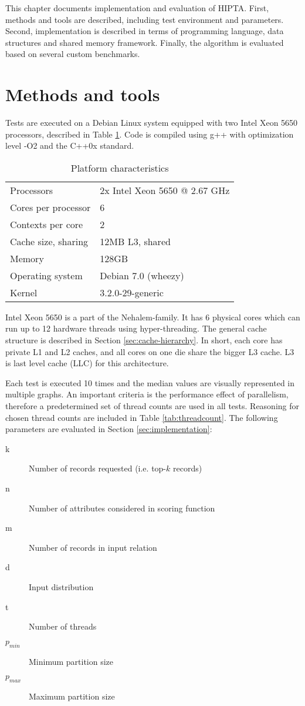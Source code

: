 This chapter documents implementation and evaluation of HIPTA. First,
methods and tools are described, including test environment and
parameters. Second, implementation is described in terms of
programming language, data structures and shared memory framework.
Finally, the algorithm is evaluated based on several custom
benchmarks.

\section{Methods and tools}
\label{sec:methods-and-tools}

Tests are executed on a Debian Linux system equipped with two Intel
Xeon 5650 processors, described in Table \ref{tab:environment}. Code
is compiled using g++ with optimization level -O2 and the C++0x
standard.

\begin{table}[H]
	\centering
	\begin{tabular}{|l|l|}
	\hline
	Processors & 2x Intel Xeon 5650 @ 2.67 GHz \\
	Cores per processor & 6 \\
	Contexts per core & 2 \\
	Cache size, sharing & 12MB L3, shared \\
	Memory & 128GB \\
	Operating system & Debian 7.0 (wheezy) \\
	Kernel & 3.2.0-29-generic \\
	\hline
	\end{tabular}
	\caption{Platform characteristics}
	\label{tab:environment}
\end{table}

Intel Xeon 5650 is a part of the Nehalem-family. It has 6 physical
cores which can run up to 12 hardware threads using hyper-threading.
The general cache structure is described in Section
\ref{sec:cache-hierarchy}. In short, each core has private L1 and L2
caches, and all cores on one die share the bigger L3 cache. L3 is last
level cache (LLC) for this architecture.

Each test is executed 10 times and the median values are visually
represented in multiple graphs. An important criteria is the
performance effect of parallelism, therefore a predetermined set of
thread counts are used in all tests. Reasoning for chosen thread
counts are included in Table \ref{tab:threadcount}. The following
parameters are evaluated in Section \ref{sec:implementation}:

\begin{description}
	\item[k] Number of records requested (i.e. top-$k$ records)
	\item[n] Number of attributes considered in scoring function
	\item[m] Number of records in input relation
	\item[d] Input distribution
	\item[t] Number of threads
	\item[$p_{min}$] Minimum partition size
	\item[$p_{max}$] Maximum partition size
\end{description}

